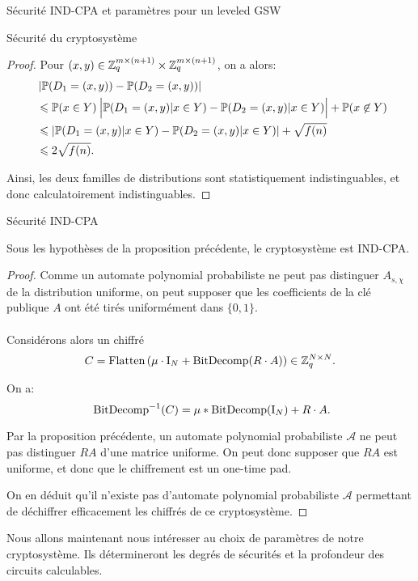 \begin{section}{Sécurité IND-CPA et paramètres pour un leveled GSW}
\begin{subsection}{Sécurité du cryptosystème}
\begin{proof}
\vspace{0.2cm}
	Pour $(x,y)\in \mathbb{Z}_q^{m \times (n+1)} \times \mathbb{Z}_q^{m \times (n+1)}$, on a alors:
	\begin{align*}
	&\left|\PP(D_1 = (x,y)) - \PP(D_2 = (x,y))\right| \\ &\leqslant \PP(x\in Y)\:
	\Big|\PP(D_1 
	= (x,y)| x\in Y) - \PP(D_2 = (x,y)|x\in Y)\Big| + \PP(x \not\in Y)  \\
	&\leqslant |\PP(D_1 = (x,y) | x \in Y) - \PP(D_2 = (x,y)|x \in Y)| + \sqrt{f(n)} \\
	&\leqslant 2\sqrt{f(n)}.
	\end{align*}
	
	Ainsi, les deux familles de distributions sont statistiquement indistinguables, et donc calculatoirement
	indistinguables.	
	\end{proof}
	\begin{thm}{Sécurité IND-CPA}
	
	\label{ind_cpa}
	Sous les hypothèses de la proposition précédente, le cryptosystème est IND-CPA.
	\end{thm}
	\begin{proof}
	Comme un automate polynomial probabiliste ne peut pas distinguer
	$A_{s, \chi}$ de la distribution uniforme, on peut supposer que les coefficients de la clé publique $A$ ont été tirés uniformément dans $\{ 0,1 \}$.

	\paragraph{}
	Considérons alors un chiffré 
	\[C = \text{Flatten}\left(\mu \cdot \text{I}_N + \text{BitDecomp}(R\cdot A)\right) \in
	\mathbb{Z}_q^{N\times N}.\]

	On a:
	\[ \bitdecomp^{-1}(C) = \mu * \bitdecomp(\id_N) + R\cdot A.\]

	Par la proposition précédente, un automate polynomial probabiliste $\mathcal{A}$
	ne peut pas distinguer $RA$ d'une matrice uniforme. On peut donc
	supposer que $RA$ est uniforme, et donc que le chiffrement est 
	un one-time pad.

	On en déduit qu'il n'existe pas d'automate polynomial probabiliste
	$\mathcal{A}$ permettant de déchiffrer efficacement les chiffrés de ce cryptosystème.
	\end{proof}
	
	\end{subsection}

Nous allons maintenant nous intéresser au choix de paramètres de notre
cryptosystème. Ils détermineront les degrés de sécurités et la profondeur des circuits calculables.


\end{section}
